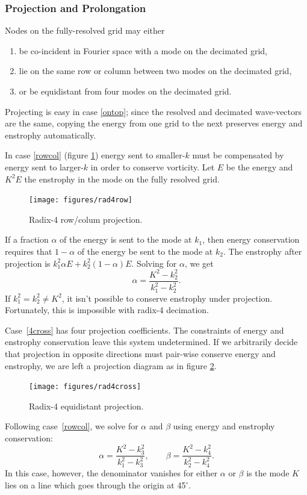 \documentclass[10pt,showpacs,showkeys,%
amsfonts,amsmath,onecolumn,
floatfix,aps,superscriptaddress]{revtex4}
\begin{document}
\subsubsection{Projection and Prolongation}
Nodes on the fully-resolved grid may either
\begin{enumerate}
\item \label{ontop}
  be co-incident in Fourier space with a mode on the decimated grid,
\item \label{rowcol}
  lie on the same row or column between two modes on the decimated grid,
\item \label{4cross}
  or be equidistant from four modes on the decimated grid.
\end{enumerate}

Projecting is easy in case \ref{ontop}; since the resolved and
decimated wave-vectors are the same, copying the energy from one grid
to the next preserves energy and enstrophy automatically.

In case \ref{rowcol} (figure \ref{rad4row}) energy sent to smaller-$k$
must be compensated by energy sent to larger-$k$ in order to conserve
vorticity.  Let $E$ be the energy and $K^2E$ the enstrophy in the mode
on the fully resolved grid.
\begin{figure}[htb]
  \begin{center}
    \texttt{[image: figures/rad4row]}
    \caption{Radix-4 row/colum projection.}
    \label{rad4row}
  \end{center}
\end{figure}
If a fraction $\alpha$ of the energy is
sent to the mode at $k_1$, then energy conservation requires that
$1-\alpha$ of the energy be sent to the mode at $k_2$.  The enstrophy
after projection is $k_1^2\alpha E+ k_2^2 (1-\alpha)E$.  Solving for 
$\alpha$, we get
\begin{dmath*}[compact]
  \alpha=\frac{K^2-k_2^2}{k_1^2-k_2^2}.
\end{dmath*}
If $k_1^2=k_2^2\neq K^2$, it isn't possible to conserve enstrophy under
projection.  Fortunately, this is impossible with radix-4 decimation.

Case~\ref{4cross} has four projection coefficients.  The constraints
of energy and enstrophy conservation leave this system undetermined.
If we arbitrarily decide that projection in opposite directions must
pair-wise conserve energy and enstrophy, we are left a projection
diagram as in figure \ref{rad4cross}.
\begin{figure}[htb]
  \begin{center}
    \texttt{[image: figures/rad4cross]}
    \caption{Radix-4 equidistant projection.}
    \label{rad4cross}
  \end{center}
\end{figure}
Following case~\ref{rowcol}, we solve for $\alpha$ and $\beta$ using
energy and enstrophy conservation:
\begin{dmath*}[compact]
  \alpha=\frac{K^2-k_3^2}{k_1^2-k_3^2}, 
  \qquad 
  \beta=\frac{K^2-k_4^2}{k_2^2-k_4^2}.
\end{dmath*}
In this case, however, the denominator vanishes for either $\alpha$ or $\beta$
is the mode $K$ lies on a line which goes through the origin at 45$^\circ$.
\end{document}
